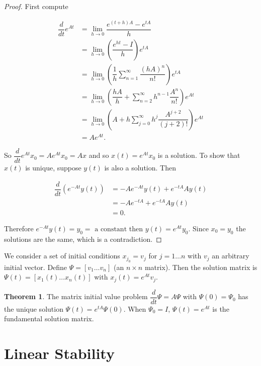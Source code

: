 \documentclass[12pt]{article}
\theoremstyle{definition}
\newtheorem{theorem}{Theorem}[section]  %
\begin{document}
\begin{proof}
First compute

\[
\begin{split}
\dfrac{d}{dt} e^{At} &= \lim_{h \rightarrow 0} \dfrac{e^{(t + h)A} - e^{tA}}{h} \\
&= \lim_{h \rightarrow 0} \left(\dfrac{e^{ht} - I}{h} \right) e^{tA} \\
&= \lim_{h \rightarrow 0} \left( \dfrac{1}{h} \sum_{n = 1}^{\infty} \dfrac{(hA)^n}{n!} \right) e^{tA} \\
&= \lim_{h \rightarrow 0} \left( \dfrac{hA}{h} + \sum_{n = 2}^{\infty} h^{n-1} \dfrac{A^n}{n!} \right) e^{At} \\
&= \lim_{h \rightarrow 0} \left( A + h \sum_{j = 0}^{\infty} h^j \dfrac{A^{j + 2}}{(j+2)!} \right) e^{At} \\
&= A e^{At}.
\end{split}
\]

So $\dfrac{d}{dt} e^{At}x_0 = Ae^{At}x_0 = Ax$ and so $x(t) = e^{At}x_0$ is a solution. To show that $x(t)$ is unique,
suppose $y(t)$ is also a solution. Then

\[
\begin{split}
\dfrac{d}{dt} \left( e^{-At} y(t) \right) &= -Ae^{-At} y(t) + e^{-tA} A y(t) \\
&= -Ae^{-tA} + e^{-tA}A y(t) \\
&= 0.
\end{split}
\]

Therefore $e^{-At}y(t) = y_0 = \text{ a constant}$ then $y(t) = e^{At}y_0$. Since $x_0 = y_0$ the solutions are the same,
which is a contradiction.
\end{proof}

We consider a set of initial conditions $x_{j_{0}} = v_j$ for $j = 1 \ldots n$ with $v_j$ an arbitrary initial vector. Define
$\Psi = [v_1 \ldots v_n]$ (an $n \times n$ matrix). Then the solution matrix is $\Psi(t) = [x_1(t) \ldots x_n(t)]$ with
$x_j(t) = e^{At}v_j$.

\begin{theorem}
The matrix initial value problem $\dfrac{d}{dt} \Psi = A \Psi$ with $\Psi(0) = \Psi_0$ has the unique solution
$\Psi(t) = e^{tA}\Psi(0)$. When $\Psi_0 = I$, $\Psi(t) = e^{At}$ is the fundamental solution matrix. 
\end{theorem}

\section{Linear Stability}
\end{document}
